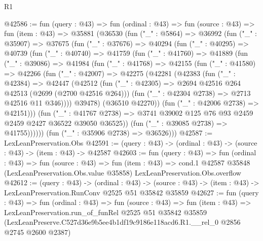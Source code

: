 \begin{lexlean}{R1}
\begin{coremodule}
@42586 := fun (query : @43) =>
  fun (ordinal : @43) =>
  fun (source : @43) =>
  fun (item : @43) =>
  @35881
    (@36530
      (fun ("_" : @5864) =>
      @36992
        (fun ("_" : @35907) =>
        @37675
          (fun ("_" : @37676) =>
          @40294
            (fun ("_" : @40295) =>
            @40739
              (fun ("_" : @40740) =>
              @41759
                (fun ("_" : @41760) =>
                @41889
                  (fun ("_" : @39086) =>
                  @41984
                    (fun ("_" : @41768) =>
                    @42155
                      (fun ("_" : @41580) =>
                      @42266
                        (fun ("_" : @42007) =>
                        @42275
                          (@42281
                            (@42383
                              (fun ("_" : @42384) =>
                              @42447
                                (@42512
                                  (fun ("_" : @42305) =>
                                  @2694 @42516 @264 @42513 (@2699 (@2700 @42516 @264)))
                                  (fun ("_" : @42304 @2738) => @2713 @42516 @11 @346))))
                            @39478)
                          (@36510 @42270))
                        (fun ("_" : @42006 @2738) => @42151)))
                    (fun ("_" : @41767 @2738) =>
                    @3741 @39002 @125 @76 @93 @2459 @2459 @2427 @36522 @39050 @36525))
                  (fun ("_" : @39085 @2738) => @41755))))))
        (fun ("_" : @35906 @2738) => @36526)))
@42587 := LexLeanPreservation.Obs
@42591 := (query : @43) -> (ordinal : @43) -> (source : @43) -> (item : @43) -> @42587
@42603 := fun (query : @43) =>
  fun (ordinal : @43) =>
  fun (source : @43) =>
  fun (item : @43) =>
  cond.{1} @42587 @35848 (LexLeanPreservation.Obs.value @35858) LexLeanPreservation.Obs.overflow
@42612 := (query : @43) ->
  (ordinal : @43) ->
  (source : @43) -> (item : @43) -> LexLeanPreservation.RunConv @2525 @51 @35842 @35859
@42627 := fun (query : @43) =>
  fun (ordinal : @43) =>
  fun (source : @43) =>
  fun (item : @43) =>
  LexLeanPreservation.run_of_funRel
    @2525
    @51
    @35842
    @35859
    (LexLeanPreserve.C527d36e9b5ee4b1df19c9186e118acd6.R1.__rel_0 @2856 @2745 @2600 @2387)
\end{coremodule}
\end{lexlean}
